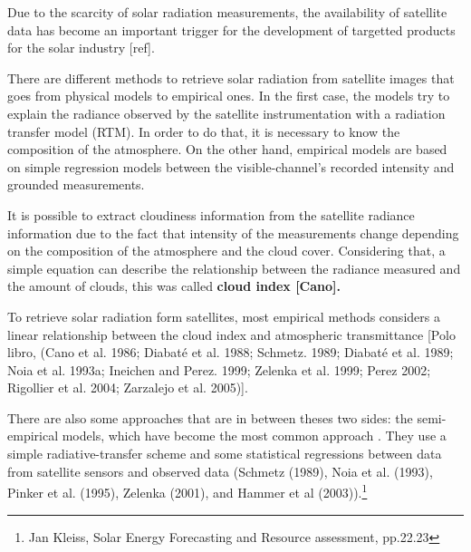Due to the scarcity of solar radiation measurements, the availability of satellite data has become an important trigger for the development of targetted products for the solar industry [ref].

There are different methods to retrieve solar radiation from satellite images that goes from physical models to empirical ones. In the first case, the models try to explain the radiance observed by the satellite instrumentation with a radiation transfer model (RTM). In order to do that, it is necessary to know the composition of the atmosphere. On the other hand, empirical models are based on simple regression models between the visible-channel's recorded intensity and grounded measurements. 

It is possible to extract cloudiness information from the satellite radiance information due to the fact that intensity of the measurements change depending on the composition of the atmosphere and the cloud cover. Considering that, a simple equation can describe the relationship between the radiance measured and the amount of clouds, this was called \textbf{cloud index [Cano].}

To retrieve solar radiation form satellites, most empirical methods considers a linear relationship between the cloud index and atmospheric transmittance \cite*{Polo2008} [Polo libro, (Cano et al. 1986; Diabaté et al. 1988; Schmetz. 1989; Diabaté et al. 1989; Noia et al. 1993a; Ineichen and Perez. 1999; Zelenka et al. 1999; Perez 2002; Rigollier et al. 2004; Zarzalejo et al. 2005)].  


There are also some approaches that are in between theses two sides: the semi-empirical models, which have become the most common approach \cite*{Polo2008}. They use a simple radiative-transfer scheme and some statistical regressions between data from satellite sensors and observed data (Schmetz (1989), Noia et al. (1993), Pinker et al. (1995), Zelenka (2001), and Hammer et al (2003)).\footnote{Jan Kleiss, Solar Energy Forecasting and Resource assessment, pp.22.23}



